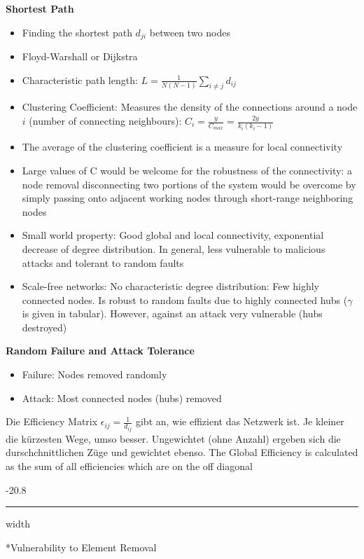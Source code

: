 \documentclass[8pt, landscape, fleqn]{scrartcl}
\makeatletter
\renewcommand{\subsubsection}{\@startsection{subsubsection}{1}{0mm}%
{-2\baselineskip}{0.8\baselineskip}%
{\hrule depth 0.2pt width\columnwidth\vspace*{1.2em}\normalsize\bfseries\rmfamily}}
\makeatother
\begin{document}
\begin{multicols*}{3}
\textbf{Shortest Path}

\begin{itemize}
    \item Finding the shortest path $d_{ji}$ between two nodes
    \item Floyd-Warshall or Dijkstra
    \item Characteristic path length: $L = \frac{1}{N(N-1)}\sum_{i \neq j} d_{ij} $
    \item Clustering Coefficient: Measures the density of the connections around a node $i$ (number of connecting neighbours): $C_i = \frac{y}{C_{max}} = \frac{2 y}{k_i (k_i -1)}$
    \item The average of the clustering coefficient is a measure for local connectivity
    \item Large values of C would be welcome for the robustness of the connectivity: a node removal disconnecting two portions of the system would be overcome by simply passing onto adjacent working nodes through short-range neighboring nodes
    \item Small world property: Good global and local connectivity, exponential decrease of degree distribution. In general, less vulnerable to malicious attacks and tolerant to random faults
    \item Scale-free networks: No characteristic degree distribution: Few highly connected nodes. Is robust to random faults due to highly connected hubs ($\gamma$ is given in tabular). However, against an attack very vulnerable (hubs destroyed)
\end{itemize}

\textbf{Random Failure and Attack Tolerance}

\begin{itemize}
    \item Failure: Nodes removed randomly
    \item Attack: Most connected nodes (hubs) removed
\end{itemize}

Die Efficiency Matrix $\epsilon_{ij} = \frac{1}{d_{ij}}$ gibt an, wie effizient das Netzwerk ist. Je kleiner die kürzesten Wege, umso besser. Ungewichtet (ohne Anzahl) ergeben sich die durschchnittlichen Züge und gewichtet ebenso. The Global Efficiency is calculated as the sum of all efficiencies which are on the off diagonal

\subsubsection*{Vulnerability to Element Removal}


\end{multicols*}
\end{document}
